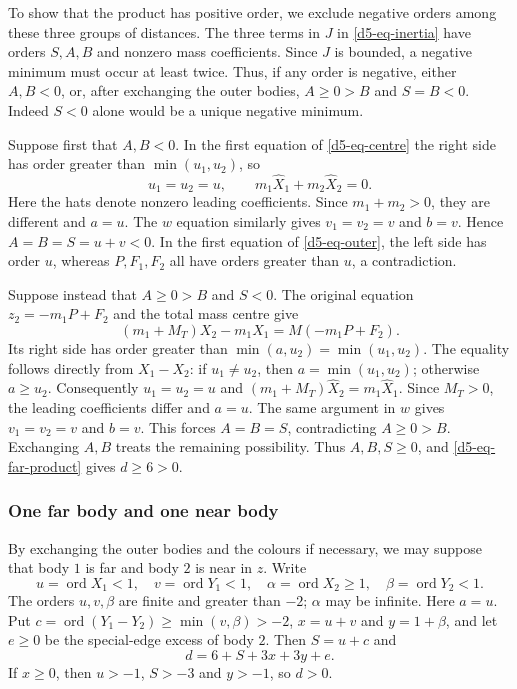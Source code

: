 \documentclass[11pt]{amsart}
\theoremstyle{definition}
\theoremstyle{remark}
\newcommand{\ord}{\operatorname{ord}}
\begin{document}
{To show that the product has positive order, we exclude negative orders
among these three groups of distances.  The three terms in $J$ in
\eqref{d5-eq-inertia} have orders $S,A,B$ and nonzero mass coefficients.
Since $J$ is bounded, a negative minimum must occur at least twice.
Thus, if any order is negative, either
$A,B<0$, or, after exchanging the outer bodies, $A\ge0>B$ and $S=B<0$.
Indeed $S<0$ alone would be a unique negative minimum.

Suppose first that $A,B<0$.  In the first equation of \eqref{d5-eq-centre} the
right side has order greater than $\min(u_1,u_2)$, so
\[
 u_1=u_2=u,\qquad m_1\widehat X_1+m_2\widehat X_2=0.
\]
Here the hats denote nonzero leading coefficients.  Since $m_1+m_2>0$, they
are different and $a=u$.  The $w$ equation similarly gives $v_1=v_2=v$ and
$b=v$.  Hence $A=B=S=u+v<0$.  In the first equation of
\eqref{d5-eq-outer}, the left side has order $u$, whereas $P,F_1,F_2$ all have
orders greater than $u$, a contradiction.

Suppose instead that $A\ge0>B$ and $S<0$.  The original equation
$z_2=-m_1P+F_2$ and the total mass centre give
\[
 (m_1+M_T)X_2-m_1X_1=M(-m_1P+F_2).
\]
Its right side has order greater than
$\min(a,u_2)=\min(u_1,u_2)$.  The equality follows directly from
$X_1-X_2$: if $u_1\ne u_2$, then $a=\min(u_1,u_2)$; otherwise $a\ge u_2$.
Consequently $u_1=u_2=u$ and
$(m_1+M_T)\widehat X_2=m_1\widehat X_1$.  Since $M_T>0$, the leading
coefficients differ and $a=u$.  The same argument in $w$ gives
$v_1=v_2=v$ and $b=v$.  This forces $A=B=S$, contradicting $A\ge0>B$.
Exchanging $A,B$ treats the remaining possibility.
Thus $A,B,S\ge0$, and \eqref{d5-eq-far-product} gives $d\ge6>0$.

\subsubsection{One far body and one near body}\label{d5-far-near}
By exchanging the outer bodies and the colours if necessary, we may suppose
that body $1$ is far and body $2$ is near in
$z$.  Write
\[
 u=\ord X_1<1,\quad v=\ord Y_1<1,\quad
 \alpha=\ord X_2\ge1,\quad \beta=\ord Y_2<1.
\]
The orders $u,v,\beta$ are finite and greater than $-2$; $\alpha$ may be infinite.
Here $a=u$.  Put $c=\ord(Y_1-Y_2)\ge\min(v,\beta)>-2$,
$x=u+v$ and $y=1+\beta$, and let $e\ge0$ be the special-edge excess of body $2$.
Then $S=u+c$ and
\begin{equation}\label{d5-eq-mixed-product}
 d=6+S+3x+3y+e.
\end{equation}
If $x\ge0$, then $u>-1$, $S>-3$ and $y>-1$, so $d>0$.

}
\end{document}
